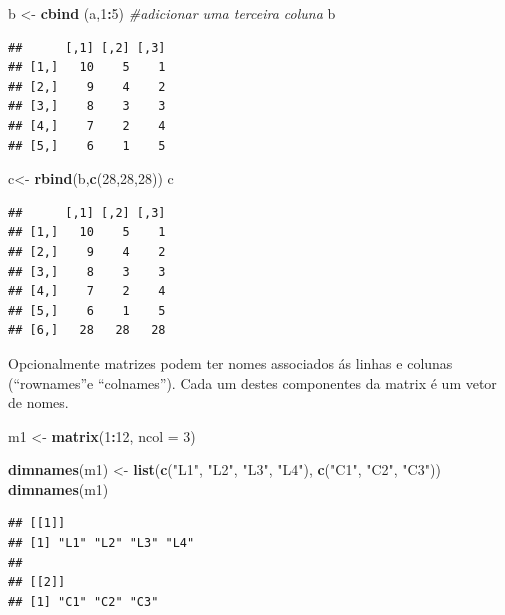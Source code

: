 \documentclass[]{book}
\newenvironment{Shaded}{\begin{snugshade}}{\end{snugshade}}
\newcommand{\CommentTok}[1]{\textcolor[rgb]{0.56,0.35,0.01}{\textit{#1}}}
\newcommand{\DataTypeTok}[1]{\textcolor[rgb]{0.13,0.29,0.53}{#1}}
\newcommand{\DecValTok}[1]{\textcolor[rgb]{0.00,0.00,0.81}{#1}}
\newcommand{\KeywordTok}[1]{\textcolor[rgb]{0.13,0.29,0.53}{\textbf{#1}}}
\newcommand{\NormalTok}[1]{#1}
\newcommand{\OperatorTok}[1]{\textcolor[rgb]{0.81,0.36,0.00}{\textbf{#1}}}
\newcommand{\StringTok}[1]{\textcolor[rgb]{0.31,0.60,0.02}{#1}}
\begin{document}
\begin{Shaded}
\begin{Highlighting}[]
\NormalTok{b <-}\StringTok{ }\KeywordTok{cbind}\NormalTok{ (a,}\DecValTok{1}\OperatorTok{:}\DecValTok{5}\NormalTok{) }\CommentTok{#adicionar uma terceira coluna}
\NormalTok{b}
\end{Highlighting}
\end{Shaded}

\begin{verbatim}
##      [,1] [,2] [,3]
## [1,]   10    5    1
## [2,]    9    4    2
## [3,]    8    3    3
## [4,]    7    2    4
## [5,]    6    1    5
\end{verbatim}

\begin{Shaded}
\begin{Highlighting}[]
\NormalTok{c<-}\StringTok{ }\KeywordTok{rbind}\NormalTok{(b,}\KeywordTok{c}\NormalTok{(}\DecValTok{28}\NormalTok{,}\DecValTok{28}\NormalTok{,}\DecValTok{28}\NormalTok{))}
\NormalTok{c}
\end{Highlighting}
\end{Shaded}

\begin{verbatim}
##      [,1] [,2] [,3]
## [1,]   10    5    1
## [2,]    9    4    2
## [3,]    8    3    3
## [4,]    7    2    4
## [5,]    6    1    5
## [6,]   28   28   28
\end{verbatim}

Opcionalmente matrizes podem ter nomes associados ás linhas e colunas (``rownames''e ``colnames''). Cada um destes componentes da matrix é um vetor de nomes.

\begin{Shaded}
\begin{Highlighting}[]
\NormalTok{m1 <-}\StringTok{ }\KeywordTok{matrix}\NormalTok{(}\DecValTok{1}\OperatorTok{:}\DecValTok{12}\NormalTok{, }\DataTypeTok{ncol =} \DecValTok{3}\NormalTok{) }

\KeywordTok{dimnames}\NormalTok{(m1) <-}\StringTok{ }\KeywordTok{list}\NormalTok{(}\KeywordTok{c}\NormalTok{(}\StringTok{"L1"}\NormalTok{, }\StringTok{"L2"}\NormalTok{, }\StringTok{"L3"}\NormalTok{, }\StringTok{"L4"}\NormalTok{), }\KeywordTok{c}\NormalTok{(}\StringTok{"C1"}\NormalTok{, }\StringTok{"C2"}\NormalTok{, }\StringTok{"C3"}\NormalTok{)) }
\KeywordTok{dimnames}\NormalTok{(m1)}
\end{Highlighting}
\end{Shaded}

\begin{verbatim}
## [[1]]
## [1] "L1" "L2" "L3" "L4"
## 
## [[2]]
## [1] "C1" "C2" "C3"
\end{verbatim}
\end{document}
